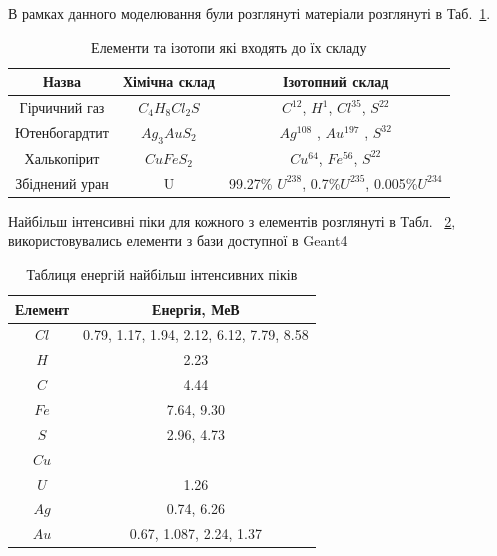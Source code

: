 \documentclass[a4paper, 14pt]{article}
\numberwithin{equation}{section}
\numberwithin{table}{section}
\begin{document}
В рамках данного моделювання були розглянуті матеріали розглянуті в Таб.~\ref{tabl:Materials}.
\begin{table}[h]
	\centering
	\caption{Елементи та ізотопи які входять до їх складу} 
	\begin{tabular}{|c|c|c|}
		\hline
		Назва & Хімічна склад & Ізотопний склад \\
		\hline
		Гірчичний газ & $C_4H_8Cl_2S$ & $C^{12}$, 	$H^1$, $Cl^{35}$, $S^{22}$ \\
		\hline
		Ютенбогардтит & $Ag_3AuS_2$ & $Ag^{108}$ , $Au^{197}$ , $S^{32}$ \\
		\hline
		Халькопірит & $CuFeS_2$ & $Cu^{64}$, $Fe^{56}$, $S^{22}$ \\
		\hline
		Збіднений уран & U & 99.27\% $U^{238}$, 0.7\%$U^{235}$, 0.005\%$U^{234}$\\
		\hline
	\end{tabular}
	\label{tabl:Materials}
\end{table}

Найбільш інтенсивні піки для кожного з елементів розглянуті в Табл. ~\ref{tabl:ElementsEnergy}, використовувались елементи з бази доступної в Geant4
\begin{table}[h]
	\centering
	\caption{Таблиця енергій найбільш інтенсивних піків} 
	\begin{tabular}{|c|c|} 
		\hline
		Елемент& Енергія, МеВ \\
		\hline
		$Cl$ & 0.79, 1.17, 1.94, 2.12, 6.12, 7.79, 8.58 \\
		\hline
		$H$ & 2.23 \\
		\hline
		$C$ & 4.44 \\
		\hline
		$Fe$ & 7.64, 9.30 \\		
		\hline
		$S$ & 2.96, 4.73 \\
		\hline
		$Cu$ &  \\
		\hline
		$U$ & 1.26\\
		\hline
		$Ag$ &  0.74, 6.26 \\
		\hline
		$Au$ & 0.67, 1.087, 2.24, 1.37  \\
		
		\hline
	\end{tabular}
	\label{tabl:ElementsEnergy}
\end{table}
	
\end{document}
